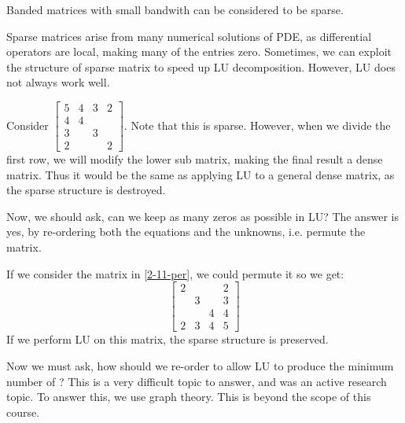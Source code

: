 \documentclass[../main/main.tex]{subfiles}
\begin{document}
\begin{remark}
Banded matrices with small bandwith can be considered to be sparse.
\end{remark}
Sparse matrices arise from many numerical solutions of PDE, as differential operators are local, making many of the entries zero. Sometimes, we can exploit the structure of sparse matrix to speed up LU decomposition. However, LU does not always work well.
\begin{example}
  \label{2-11-per}
Consider $ \begin{bmatrix}
  5&4&3&2\\
  4&4&&\\
  3&&3&\\
  2&&&2
\end{bmatrix}$. Note that this is sparse. However, when we divide the first row, we will modify the lower sub matrix, making the final result a dense matrix. Thus it would be the same as applying LU to a general dense matrix, as the sparse structure is destroyed.
\end{example}
Now, we should ask, can we keep as many zeros as possible in LU? The answer is yes, by re-ordering both the equations and the unknowns, i.e. permute the matrix.
\begin{example}
  If we consider the matrix in \ref{2-11-per}, we could permute it so we get: \[
\begin{bmatrix}
  2&&&2\\
  &3&&3\\
  &&4&4\\
  2&3&4&5
\end{bmatrix}
\]
If we perform LU on this matrix, the sparse structure is preserved.
\end{example}
Now we must ask, how should we re-order to allow LU to produce the minimum number of ? This is a very difficult topic to answer, and was an active research topic. To answer this, we use graph theory. This is beyond the scope of this course.
\end{document}
